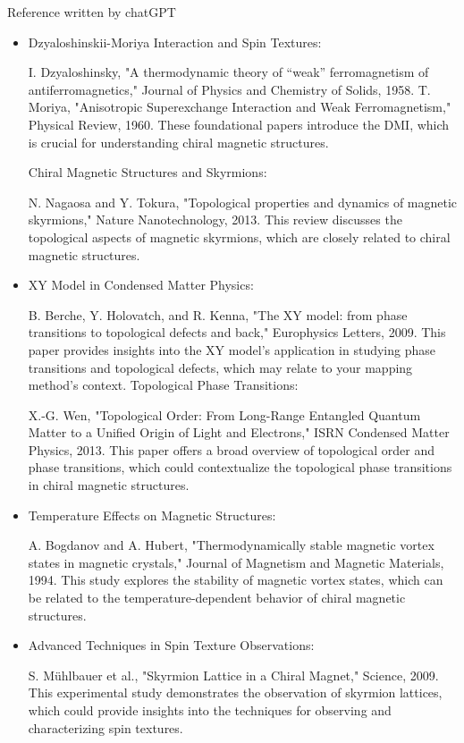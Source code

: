 \documentclass[12pt]{article}
\theoremstyle{problemstyle}
\begin{document}
\vspace{8mm}
Reference written by chatGPT
\begin{itemize}

\item Dzyaloshinskii-Moriya Interaction and Spin Textures:

I. Dzyaloshinsky, "A thermodynamic theory of “weak” ferromagnetism of antiferromagnetics," Journal of Physics and Chemistry of Solids, 1958.
T. Moriya, "Anisotropic Superexchange Interaction and Weak Ferromagnetism," Physical Review, 1960.
These foundational papers introduce the DMI, which is crucial for understanding chiral magnetic structures.

Chiral Magnetic Structures and Skyrmions:

N. Nagaosa and Y. Tokura, "Topological properties and dynamics of magnetic skyrmions," Nature Nanotechnology, 2013.
This review discusses the topological aspects of magnetic skyrmions, which are closely related to chiral magnetic structures.

\item XY Model in Condensed Matter Physics:

B. Berche, Y. Holovatch, and R. Kenna, "The XY model: from phase transitions to topological defects and back," Europhysics Letters, 2009.
This paper provides insights into the XY model's application in studying phase transitions and topological defects, which may relate to your mapping method's context.
Topological Phase Transitions:

X.-G. Wen, "Topological Order: From Long-Range Entangled Quantum Matter to a Unified Origin of Light and Electrons," ISRN Condensed Matter Physics, 2013.
This paper offers a broad overview of topological order and phase transitions, which could contextualize the topological phase transitions in chiral magnetic structures.

\item Temperature Effects on Magnetic Structures:

A. Bogdanov and A. Hubert, "Thermodynamically stable magnetic vortex states in magnetic crystals," Journal of Magnetism and Magnetic Materials, 1994.
This study explores the stability of magnetic vortex states, which can be related to the temperature-dependent behavior of chiral magnetic structures.

\item Advanced Techniques in Spin Texture Observations:

S. Mühlbauer et al., "Skyrmion Lattice in a Chiral Magnet," Science, 2009.
This experimental study demonstrates the observation of skyrmion lattices, which could provide insights into the techniques for observing and characterizing spin textures.
\end{itemize}
\end{document}
